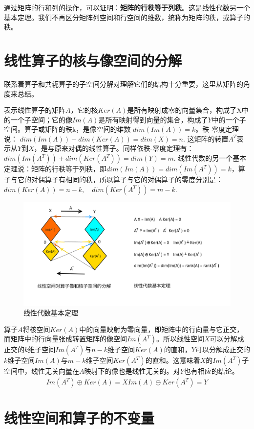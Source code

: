 	通过矩阵的行和列的操作，可以证明：\textbf{矩阵的行秩等于列秩}。这是线性代数另一个基本定理。我们不再区分矩阵列空间和行空间的维数，统称为矩阵的秩，或算子的秩。
	
	\section{线性算子的核与像空间的分解}
	
	联系着算子和共轭算子的子空间分解对理解它们的结构十分重要，这里从矩阵的角度来总结。
	
	表示线性算子的矩阵$ A $，它的核$ Ker(A) $是所有映射成零的向量集合，构成了X中的一个子空间；它的像$ Im(A) $是所有映射得到向量的集合，构成了$ Y $中的一个子空间。算子或矩阵的秩k，是像空间的维数 $ dim(Im(A)) = k $。秩-零度定理说： $ dim(Im(A))+dim(Ker(A)) = dim(X) = n $. 这矩阵的转置$ A^T $表示从$ Y $到$ X $，是与原来对偶的线性算子。同样依秩-零度定理有：$ dim(Im(A^T)) + dim(Ker(A^T)) = dim(Y) = m $. 线性代数的另一个基本定理说：矩阵的行秩等于列秩，即$ dim(Im(A)) = dim(Im(A^T)) = k $，算子与它的对偶算子有相同的秩，所以算子与它的对偶算子的零度分别是：
		$ dim(Ker(A)) = n-k,\quad dim(Ker(A^T)) = m-k $. 
	
	\begin{figure}[h]
		\centering
		\includegraphics[width=0.7\linewidth]{pic/1604494yzy1do1yro41gva.png}
		\caption{线性代数基本定理}
		\label{1604494yzy1do1yro41gva}
	\end{figure}

	算子$ A $将核空间$ Ker(A) $中的向量映射为零向量，即矩阵中的行向量与它正交，而矩阵中的行向量张成转置矩阵的像空间$ Im(A^T) $。所以线性空间$ X $可以分解成正交的$ k $维子空间$ Im(A^T) $与$ n-k $维子空间$ Ker(A) $的直和，$ Y $可以分解成正交的$ k $维子空间$ Im(A) $与$ m-k $维子空间$ Ker(A^T) $的直和。这意味着$ X $的$ Im(A^T) $子空间中，线性无关向量在$ A $映射下的像也是线性无关的。对$ Y $也有相应的结论。
	\begin{gather*}
		Im(A^T)\oplus Ker(A)=X  Im(A)\oplus Ker(A^T)=Y
	\end{gather*}
	
	\section{线性空间和算子的不变量}
	
